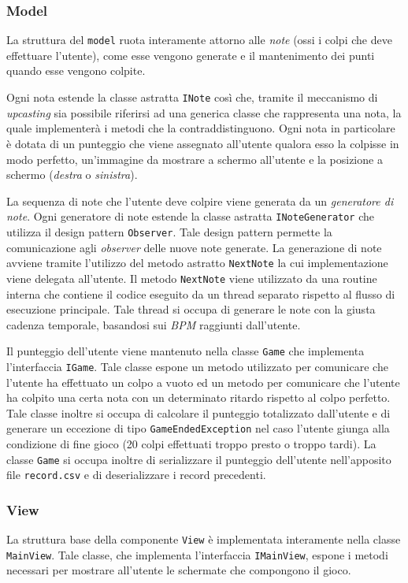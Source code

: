 \subsubsection{Model}
La struttura del \texttt{model} ruota interamente attorno alle \emph{note} (ossi i colpi che deve effettuare l'utente), come esse vengono generate e il mantenimento dei punti quando esse vengono colpite.

Ogni nota estende la classe astratta \texttt{INote} così che, tramite il meccanismo di \emph{upcasting} sia possibile riferirsi ad una generica classe che rappresenta una nota, la quale implementerà i metodi che la contraddistinguono.
Ogni nota in particolare è dotata di un punteggio che viene assegnato all'utente qualora esso la colpisse in modo perfetto, un'immagine da mostrare a schermo all'utente e la posizione a schermo (\emph{destra} o \emph{sinistra}).

La sequenza di note che l'utente deve colpire viene generata da un \emph{generatore di note}. Ogni generatore di note estende la classe astratta \texttt{INoteGenerator} che utilizza il design pattern \texttt{Observer}. Tale design pattern permette la comunicazione agli \emph{observer} delle nuove note generate.
La generazione di note avviene tramite l'utilizzo del metodo astratto \texttt{NextNote} la cui implementazione viene delegata all'utente.
Il metodo \texttt{NextNote} viene utilizzato da una routine interna che contiene il codice eseguito da un thread separato rispetto al flusso di esecuzione principale.
Tale thread si occupa di generare le note con la giusta cadenza temporale, basandosi sui \emph{BPM} raggiunti dall'utente.

Il punteggio dell'utente viene mantenuto nella classe \texttt{Game} che implementa l'interfaccia \texttt{IGame}. Tale classe espone un metodo utilizzato per comunicare che l'utente ha effettuato un colpo a vuoto ed un metodo per comunicare che l'utente ha colpito una certa nota con un determinato ritardo rispetto al colpo perfetto.
Tale classe inoltre si occupa di calcolare il punteggio totalizzato dall'utente e di generare un eccezione di tipo \texttt{GameEndedException} nel caso l'utente giunga alla condizione di fine gioco (20 colpi effettuati troppo presto o troppo tardi).
La classe \texttt{Game} si occupa inoltre di serializzare il punteggio dell'utente nell'apposito file \texttt{record.csv} e di deserializzare i record precedenti.

\subsubsection{View}
La struttura base della componente \texttt{View} è implementata interamente nella classe \texttt{MainView}. Tale classe, che implementa l'interfaccia \texttt{IMainView}, espone i metodi necessari per mostrare all'utente le schermate che compongono il gioco.

